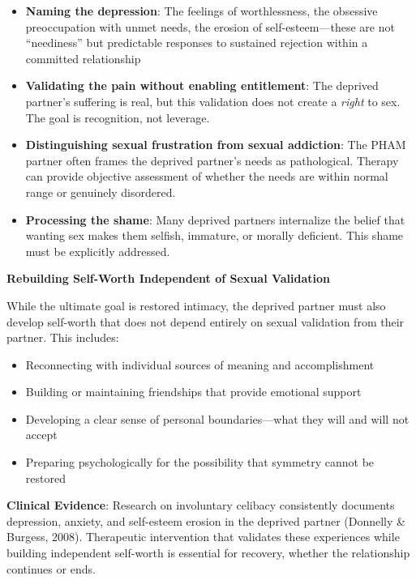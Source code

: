 \documentclass[12pt, letterpaper]{article}
\begin{document}
\begin{itemize}
    \item \textbf{Naming the depression}: The feelings of worthlessness, the obsessive preoccupation with unmet needs, the erosion of self-esteem---these are not ``neediness'' but predictable responses to sustained rejection within a committed relationship
    \item \textbf{Validating the pain without enabling entitlement}: The deprived partner's suffering is real, but this validation does not create a \textit{right} to sex. The goal is recognition, not leverage.
    \item \textbf{Distinguishing sexual frustration from sexual addiction}: The PHAM partner often frames the deprived partner's needs as pathological. Therapy can provide objective assessment of whether the needs are within normal range or genuinely disordered.
    \item \textbf{Processing the shame}: Many deprived partners internalize the belief that wanting sex makes them selfish, immature, or morally deficient. This shame must be explicitly addressed.
\end{itemize}

\textbf{Rebuilding Self-Worth Independent of Sexual Validation}

While the ultimate goal is restored intimacy, the deprived partner must also develop self-worth that does not depend entirely on sexual validation from their partner. This includes:

\begin{itemize}
    \item Reconnecting with individual sources of meaning and accomplishment
    \item Building or maintaining friendships that provide emotional support
    \item Developing a clear sense of personal boundaries---what they will and will not accept
    \item Preparing psychologically for the possibility that symmetry cannot be restored
\end{itemize}

\textbf{Clinical Evidence}: Research on involuntary celibacy consistently documents depression, anxiety, and self-esteem erosion in the deprived partner (Donnelly \& Burgess, 2008). Therapeutic intervention that validates these experiences while building independent self-worth is essential for recovery, whether the relationship continues or ends.
\end{document}
